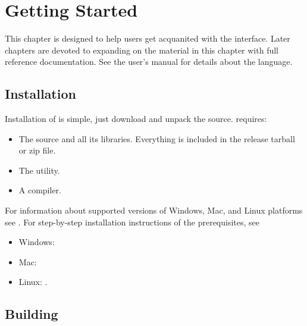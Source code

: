 \chapter{Getting Started}

\noindent
This chapter is designed to help users get acquanited with the
\CmdStan interface. Later chapters are devoted to expanding on the
material in this chapter with full reference documentation. See the
\Stan user's manual for details about the \Stan language.

\section{Installation}

Installation of \CmdStan is simple, just download and unpack the source.
\CmdStan requires:
\begin{itemize}
  \item The \CmdStan source and all its libraries. Everything is
    included in the release tarball or zip file.
  \item The  utility.
  \item A \Cpp compiler.
\end{itemize}

For information about supported versions of Windows, Mac, and Linux
platforms see . For step-by-step installation
instructions of the prerequisites, see
\begin{itemize}
  \item Windows: 
  \item Mac: 
  \item Linux: .
\end{itemize}


\section{Building \CmdStan}


